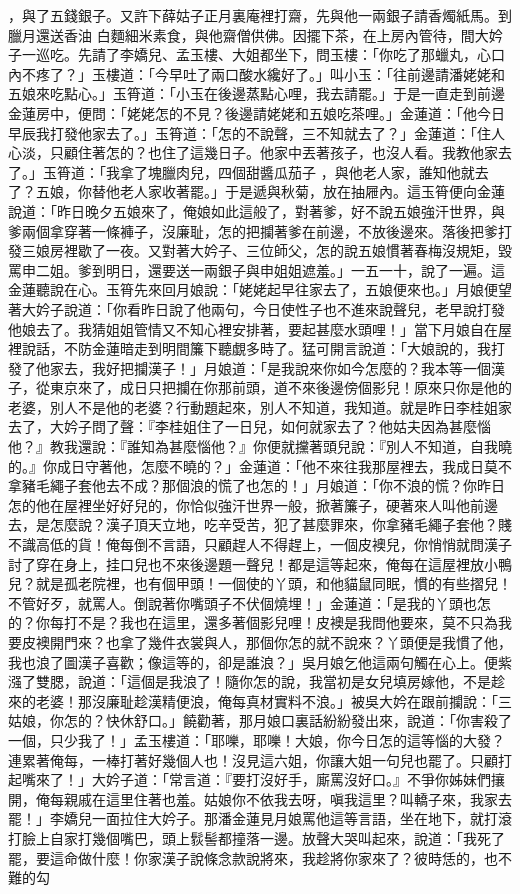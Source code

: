 \begin{showcontents}{}
，與了五錢銀子。又許下薛姑子正月裏庵裡打齋，先與他一兩銀子請香燭紙馬。到臘月還送香油 白麵細米素食，與他齋僧供佛。因擺下茶，在上房內管待，間大妗子一巡吃。先請了李嬌兒、孟玉樓、大姐都坐下，問玉樓：「你吃了那蠟丸，心口內不疼了？」玉樓道：「今早吐了兩口酸水纔好了。」叫小玉：「往前邊請潘姥姥和五娘來吃點心。」玉筲道：「小玉在後邊蒸點心哩，我去請罷。」于是一直走到前邊金蓮房中，便問：「姥姥怎的不見？後邊請姥姥和五娘吃茶哩。」金蓮道：「他今日早辰我打發他家去了。」玉筲道：「怎的不說聲，三不知就去了？」金蓮道：「住人心淡，只顧住著怎的？也住了這幾日子。他家中丟著孩子，也沒人看。我教他家去了。」玉筲道：「我拿了塊臘肉兒，四個甜醬瓜茄子 ，與他老人家，誰知他就去了？五娘，你替他老人家收著罷。」于是遞與秋菊，放在抽屜內。這玉筲便向金蓮說道：「昨日晚夕五娘來了，俺娘如此這般了，對著爹，好不說五娘強汗世界，與爹兩個拿穿著一條褲子，沒廉耻，怎的把攔著爹在前邊，不放後邊來。落後把爹打發三娘房裡歇了一夜。又對著大妗子、三位師父，怎的說五娘慣著春梅沒規矩，毀罵申二姐。爹到明日，還要送一兩銀子與申姐姐遮羞。」一五一十，說了一遍。這金蓮聽說在心。玉筲先來回月娘說：「姥姥起早往家去了，五娘便來也。」月娘便望著大妗子說道：「你看昨日說了他兩句，今日使性子也不進來說聲兒，老早說打發他娘去了。我猜姐姐管情又不知心裡安排著，要起甚麼水頭哩！」當下月娘自在屋裡說話，不防金蓮暗走到明間簾下聽覷多時了。猛可開言說道：「大娘說的，我打發了他家去，我好把攔漢子！」月娘道：「是我說來你如今怎麼的？我本等一個漢子，從東京來了，成日只把攔在你那前頭，道不來後邊傍個影兒！原來只你是他的老婆，別人不是他的老婆？行動題起來，別人不知道，我知道。就是昨日李桂姐家去了，大妗子問了聲：『李桂姐住了一日兒，如何就家去了？他姑夫因為甚麼惱他？』教我還說：『誰知為甚麼惱他？』你便就攩著頭兒說：『別人不知道，自我曉的。』你成日守著他，怎麼不曉的？」金蓮道：「他不來往我那屋裡去，我成日莫不拿豬毛繩子套他去不成？那個浪的慌了也怎的！」月娘道：「你不浪的慌？你昨日怎的他在屋裡坐好好兒的，你恰似強汗世界一般，掀著簾子，硬著來人叫他前邊去，是怎麼說？漢子頂天立地，吃辛受苦，犯了甚麼罪來，你拿豬毛繩子套他？賤不識高低的貨！俺每倒不言語，只顧趕人不得趕上，一個皮襖兒，你悄悄就問漢子討了穿在身上，挂口兒也不來後邊題一聲兒！都是這等起來，俺每在這屋裡放小鴨兒？就是孤老院裡，也有個甲頭！一個使的丫頭，和他貓鼠同眠，慣的有些摺兒！不管好歹，就罵人。倒說著你嘴頭子不伏個燒埋！」金蓮道：「是我的丫頭也怎的？你每打不是？我也在這里，還多著個影兒哩！皮襖是我問他要來，莫不只為我要皮襖開門來？也拿了幾件衣裳與人，那個你怎的就不說來？丫頭便是我慣了他，我也浪了圖漢子喜歡；像這等的，卻是誰浪？」吳月娘乞他這兩句觸在心上。便紫漒了雙腮，說道：「這個是我浪了！隨你怎的說，我當初是女兒填房嫁他，不是趁來的老婆！那沒廉耻趁漢精便浪，俺每真材實料不浪。」被吳大妗在跟前攔說：「三姑娘，你怎的？快休舒口。」饒勸著，那月娘口裏話紛紛發出來，說道：「你害殺了一個，只少我了！」孟玉樓道：「耶嚛，耶嚛！大娘，你今日怎的這等惱的大發？連累著俺每，一棒打著好幾個人也！沒見這六姐，你讓大姐一句兒也罷了。只顧打起嘴來了！」大妗子道：「常言道：『要打沒好手，廝罵沒好口。』不爭你姊妹們攘開，俺每親戚在這里住著也羞。姑娘你不依我去呀，嗔我這里？叫轎子來，我家去罷！」李嬌兒一面拉住大妗子。那潘金蓮見月娘罵他這等言語，坐在地下，就打滾打臉上自家打幾個嘴巴，頭上䯼髻都撞落一邊。放聲大哭叫起來，說道：「我死了罷，要這命做什麼！你家漢子說條念款說將來，我趁將你家來了？彼時恁的，也不難的勾
\end{showcontents}
